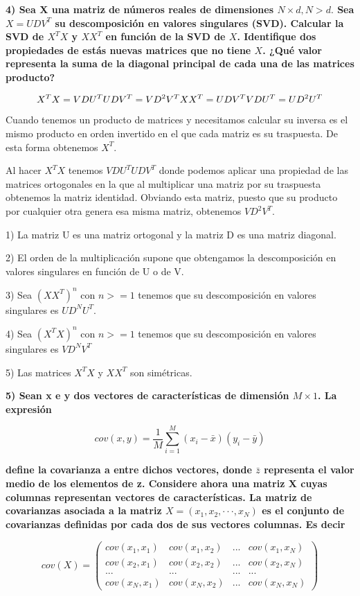 \documentclass[]{article}
\begin{document}
\textbf{4) Sea X una matriz de números reales de dimensiones
\(N × d, N > d.\) Sea \(X = UDV^T\) su descomposición en valores
singulares (SVD). Calcular la SVD de \(X^TX\) y \(XX^T\) en función de
la SVD de \(X\). Identifique dos propiedades de estás nuevas matrices
que no tiene \(X\). ¿Qué valor representa la suma de la diagonal
principal de cada una de las matrices producto?}

\[X^TX = V D U^TU D V^T = VD^2V^T\\
XX^T=U D V^TV D U^T = UD^2U^T\]

 Cuando tenemos un producto de matrices y necesitamos calcular su
inversa es el mismo producto en orden invertido en el que cada matriz es
su traspuesta. De esta forma obtenemos \(X^T\).

Al hacer \(X^TX\) tenemos \(V D U^TU D V^T\) donde podemos aplicar una
propiedad de las matrices ortogonales en la que al multiplicar una
matriz por su traspuesta obtenemos la matriz identidad. Obviando esta
matriz, puesto que su producto por cualquier otra genera esa misma
matriz, obtenemos \(VD^2V^T\).

1) La matriz U es una matriz ortogonal y la matriz D es una matriz
diagonal.

2) El orden de la multiplicación supone que obtengamos la descomposición
en valores singulares en función de U o de V.

3) Sea \((XX^T)^n\) con \(n >= 1\) tenemos que su descomposición en
valores singulares es \(U D^N U^T\).

4) Sea \((X^TX)^n\) con \(n >= 1\) tenemos que su descomposición en
valores singulares es \(V D^N V^T\)

5) Las matrices \(X^TX\) y \(XX^T\) son simétricas.

\textbf{5) Sean x e y dos vectores de características de dimensión
\(M × 1\). La expresión}

\[cov(x,y) = \frac{1}{M}  \sum_{i=1}^{M}(x_{i} - \bar{x})(y_{i} - \bar{y})\]

\textbf{define la covarianza a entre dichos vectores, donde \(\bar{z}\)
representa el valor medio de los elementos de z. Considere ahora una
matriz X cuyas columnas representan vectores de características. La
matriz de covarianzas asociada a la matriz
\(X = (x_1, x_2, · · · , x_N )\) es el conjunto de covarianzas definidas
por cada dos de sus vectores columnas. Es decir}

\[cov(X) = \begin{pmatrix}
cov(x_1,x_1)&cov(x_1,x_2)&... &cov(x_1,x_N)\\
cov(x_2,x_1)&cov(x_2,x_2)&...&cov(x_2,x_N)\\
...&...&...&...\\
cov(x_N,x_1)&cov(x_N,x_2)&...&cov(x_N,x_N)
\end{pmatrix}\]
\end{document}
